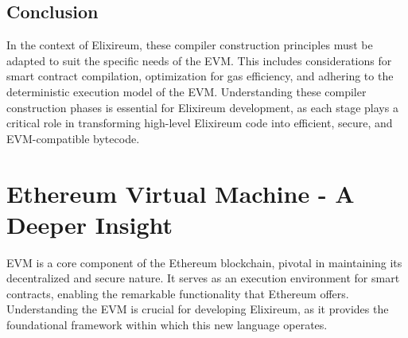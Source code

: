 \subsection{Conclusion}

In the context of Elixireum, these compiler construction principles must be adapted to suit the specific needs of the EVM. This includes considerations for smart contract compilation, optimization for gas efficiency, and adhering to the deterministic execution model of the EVM. Understanding these compiler construction phases is essential for Elixireum development, as each stage plays a critical role in transforming high-level Elixireum code into efficient, secure, and EVM-compatible bytecode.

\section{Ethereum Virtual Machine - A Deeper Insight}

EVM is a core component of the Ethereum blockchain, pivotal in maintaining its decentralized and secure nature. It serves as an execution environment for smart contracts, enabling the remarkable functionality that Ethereum offers. Understanding the EVM is crucial for developing Elixireum, as it provides the foundational framework within which this new language operates.


